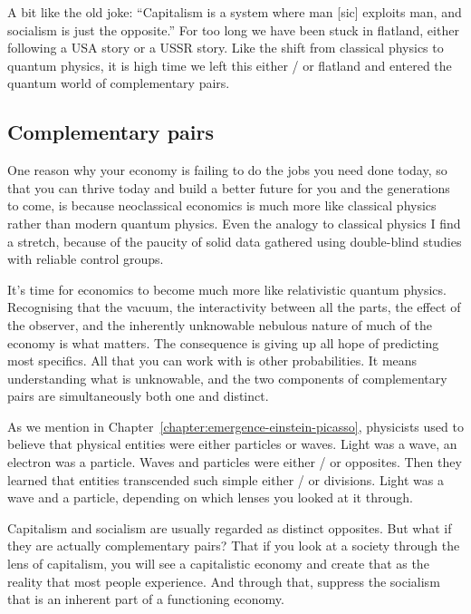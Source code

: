 A bit like the old joke: “Capitalism is a system where man [sic] exploits man, and socialism is just the opposite.” For too long we have been stuck in flatland, either following a USA story or a USSR story. Like the shift from classical physics to quantum physics, it is high time we left this either / or flatland and entered the quantum world of complementary pairs.


\subsection{Complementary pairs}
One reason why your economy is failing to do the jobs you need done today, so that you can thrive today and build a better future for you and the generations to come, is because neoclassical economics is much more like classical physics rather than modern quantum physics. Even the analogy to classical physics I find a stretch, because of the paucity of solid data gathered using double-blind studies with reliable control groups.


It's time for economics to become much more like relativistic quantum physics. Recognising that the vacuum, the interactivity between all the parts, the effect of the observer, and the inherently unknowable nebulous nature of much of the economy is what matters. The consequence is giving up all hope of predicting most specifics. All that you can work with is other probabilities. It means understanding what is unknowable, and the two components of complementary pairs are simultaneously both one and distinct.


As we mention in Chapter~\ref{chapter:emergence-einstein-picasso}, physicists used to believe that physical entities were either particles or waves. Light was a wave, an electron was a particle. Waves and particles were either / or opposites. Then they learned that entities transcended such simple either / or divisions. Light was a wave and a particle, depending on which lenses you looked at it through. 


Capitalism and socialism are usually regarded as distinct opposites. But what if they are actually complementary pairs? That if you look at a society through the lens of capitalism, you will see a capitalistic economy and create that as the reality that most people experience. And through that, suppress the socialism that is an inherent part of a functioning economy.


